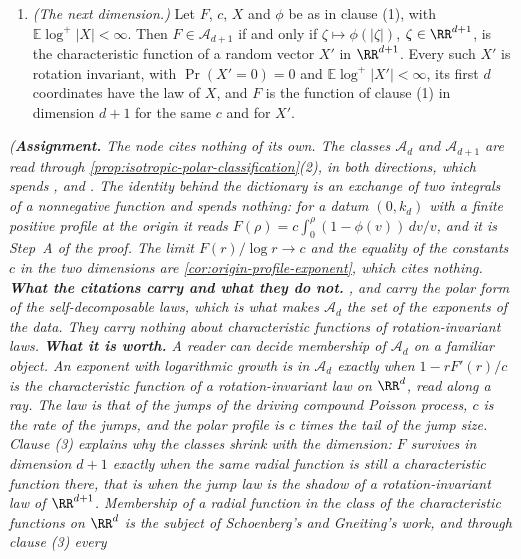 \begin{proposition}
\begin{enumerate}
has a limit in $(0,\infty)$. These are the members of $\mathcal{A}_d$ with Gaussian coefficient
$0$ and profile at the origin in $(0,\infty)$.
\item \emph{(The next dimension.)} Let $F$, $c$, $X$ and $\phi$ be as in clause (1), with
$\mathbb{E}\log^+|X| < \infty$. Then $F \in \mathcal{A}_{d+1}$ if and only if
$\zeta \mapsto \phi(|\zeta|)$, $\zeta \in \RR^{d+1}$, is the characteristic function of a random
vector $X'$ in $\RR^{d+1}$. Every such $X'$ is rotation invariant, with $\Pr(X' = 0) = 0$ and
$\mathbb{E}\log^+|X'| < \infty$, its first $d$ coordinates have the law of $X$, and $F$ is the
function of clause (1) in dimension $d + 1$ for the same $c$ and for $X'$.
\end{enumerate}
\statusA\quad{}\quad{}\quad{}\quad\emph{(\textbf{Assignment.} The node
cites nothing of its own. The classes $\mathcal{A}_d$ and $\mathcal{A}_{d+1}$ are read through
\ref{prop:isotropic-polar-classification}(2), in both directions, which spends ,
 and . The identity behind the dictionary is an exchange of two integrals of
a nonnegative function and spends nothing: for a datum $(0,k_d)$ with a finite positive profile at
the origin it reads $F(\rho) = c\int_0^\rho(1 - \phi(v))\,dv/v$, and it is Step~A of the proof.
The limit $F(r)/\log r \to c$ and the equality of the constants $c$ in the two dimensions are
\ref{cor:origin-profile-exponent}, which cites nothing. \textbf{What the citations carry and what
they do not.} ,  and  carry the polar form of the
self-decomposable laws, which is what makes $\mathcal{A}_d$ the set of the exponents of the data.
They carry nothing about characteristic functions of rotation-invariant laws. \textbf{What it is
worth.} A reader can decide membership of $\mathcal{A}_d$ on a familiar object. An exponent with
logarithmic growth is in $\mathcal{A}_d$ exactly when $1 - rF'(r)/c$ is the characteristic
function of a rotation-invariant law on $\RR^d$, read along a ray. The law is that of the jumps
of the driving compound Poisson process, $c$ is the rate of the jumps, and the polar profile is
$c$ times the tail of the jump size. Clause (3) explains why the classes shrink with the
dimension: $F$ survives in dimension $d + 1$ exactly when the same radial function is still a
characteristic function there, that is when the jump law is the shadow of a rotation-invariant
law of $\RR^{d+1}$. Membership of a radial function in the class of the characteristic functions
on $\RR^d$ is the subject of Schoenberg's and Gneiting's work, and through clause (3) every
}
\end{proposition}
